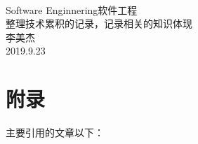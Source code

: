 \documentclass[UTF8,10pt,a4paper]{article}
\begin{document}
\begin{center}
    \quad \\
    \vspace{3cm}
    \hspace{1cm}\Large{Software Enginnering软件工程} \\
    \small{整理技术累积的记录，记录相关的知识体现} \\
    \vspace{1cm}
    \hspace{1cm}\Large{李美杰} \\
    \vspace{0.5cm}
    \hspace{1cm}\Large{2019.9.23}
    \clearpage
\end{center}

\thispagestyle{empty}
\clearpage

\tableofcontents
\clearpage

\lstset{
    language=C,
    numbers=left,
    frame=box
}




\clearpage
\section{附录}
主要引用的文章以下：



\end{document}
